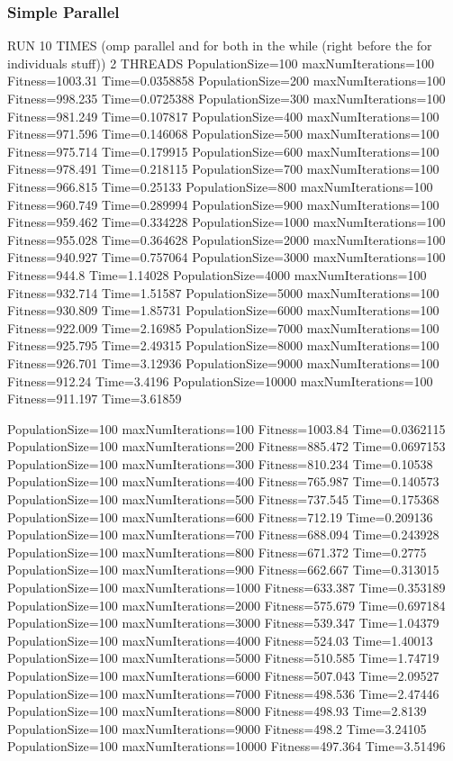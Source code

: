 \documentclass[10pt,letterpaper]{article}
\begin{document}
\subsubsection{Simple Parallel}
RUN 10 TIMES (omp parallel and for both in the while (right before the for individuals stuff)) 2 THREADS
PopulationSize=100 maxNumIterations=100 Fitness=1003.31 Time=0.0358858
PopulationSize=200 maxNumIterations=100 Fitness=998.235 Time=0.0725388
PopulationSize=300 maxNumIterations=100 Fitness=981.249 Time=0.107817
PopulationSize=400 maxNumIterations=100 Fitness=971.596 Time=0.146068
PopulationSize=500 maxNumIterations=100 Fitness=975.714 Time=0.179915
PopulationSize=600 maxNumIterations=100 Fitness=978.491 Time=0.218115
PopulationSize=700 maxNumIterations=100 Fitness=966.815 Time=0.25133
PopulationSize=800 maxNumIterations=100 Fitness=960.749 Time=0.289994
PopulationSize=900 maxNumIterations=100 Fitness=959.462 Time=0.334228
PopulationSize=1000 maxNumIterations=100 Fitness=955.028 Time=0.364628
PopulationSize=2000 maxNumIterations=100 Fitness=940.927 Time=0.757064
PopulationSize=3000 maxNumIterations=100 Fitness=944.8 Time=1.14028
PopulationSize=4000 maxNumIterations=100 Fitness=932.714 Time=1.51587
PopulationSize=5000 maxNumIterations=100 Fitness=930.809 Time=1.85731
PopulationSize=6000 maxNumIterations=100 Fitness=922.009 Time=2.16985
PopulationSize=7000 maxNumIterations=100 Fitness=925.795 Time=2.49315
PopulationSize=8000 maxNumIterations=100 Fitness=926.701 Time=3.12936
PopulationSize=9000 maxNumIterations=100 Fitness=912.24 Time=3.4196
PopulationSize=10000 maxNumIterations=100 Fitness=911.197 Time=3.61859

PopulationSize=100 maxNumIterations=100 Fitness=1003.84 Time=0.0362115
PopulationSize=100 maxNumIterations=200 Fitness=885.472 Time=0.0697153
PopulationSize=100 maxNumIterations=300 Fitness=810.234 Time=0.10538
PopulationSize=100 maxNumIterations=400 Fitness=765.987 Time=0.140573
PopulationSize=100 maxNumIterations=500 Fitness=737.545 Time=0.175368
PopulationSize=100 maxNumIterations=600 Fitness=712.19 Time=0.209136
PopulationSize=100 maxNumIterations=700 Fitness=688.094 Time=0.243928
PopulationSize=100 maxNumIterations=800 Fitness=671.372 Time=0.2775
PopulationSize=100 maxNumIterations=900 Fitness=662.667 Time=0.313015
PopulationSize=100 maxNumIterations=1000 Fitness=633.387 Time=0.353189
PopulationSize=100 maxNumIterations=2000 Fitness=575.679 Time=0.697184
PopulationSize=100 maxNumIterations=3000 Fitness=539.347 Time=1.04379
PopulationSize=100 maxNumIterations=4000 Fitness=524.03 Time=1.40013
PopulationSize=100 maxNumIterations=5000 Fitness=510.585 Time=1.74719
PopulationSize=100 maxNumIterations=6000 Fitness=507.043 Time=2.09527
PopulationSize=100 maxNumIterations=7000 Fitness=498.536 Time=2.47446
PopulationSize=100 maxNumIterations=8000 Fitness=498.93 Time=2.8139
PopulationSize=100 maxNumIterations=9000 Fitness=498.2 Time=3.24105
PopulationSize=100 maxNumIterations=10000 Fitness=497.364 Time=3.51496
\end{document}
